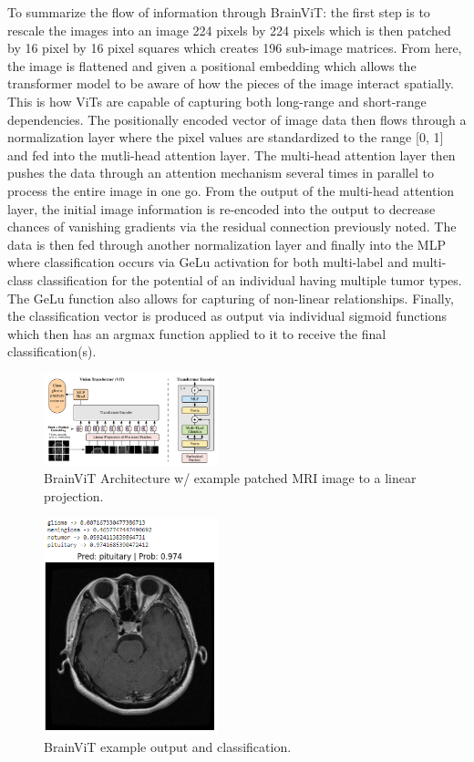 \documentclass[conference]{IEEEtran}
\begin{document}
To summarize the flow of information through BrainViT: the first step is to rescale the images into an image 224 pixels by 224 pixels which is then patched by 16 pixel by 16 pixel squares which creates 196 sub-image matrices. From here, the image is flattened and given a positional embedding which allows the transformer model to be aware of how the pieces of the image interact spatially. This is how ViTs are capable of capturing both long-range and short-range dependencies. The positionally encoded vector of image data then flows through a normalization layer where the pixel values are standardized to the range [0, 1] and fed into the mutli-head attention layer. The multi-head attention layer then pushes the data through an attention mechanism several times in parallel to process the entire image in one go. From the output of the multi-head attention layer, the initial image information is re-encoded into the output to decrease chances of vanishing gradients via the residual connection previously noted. The data is then fed through another normalization layer and finally into the MLP where classification occurs via GeLu activation for both multi-label and multi-class classification for the potential of an individual having multiple tumor types. The GeLu function also allows for capturing of non-linear relationships. Finally, the classification vector is produced as output via individual sigmoid functions which then has an argmax function applied to it to receive the final classification(s).  

\begin{figure}[h]
    \centering
    \includegraphics[width=0.45\textwidth]{arch.png}
    \caption{BrainViT Architecture w/ example patched MRI image to a linear projection.}
    \label{fig:1}
\end{figure}

\begin{figure}[h]
    \centering
    \includegraphics[width=0.45\textwidth]{example output.PNG}
    \caption{BrainViT example output and classification.}
    \label{fig:output}
\end{figure}
\end{document}
